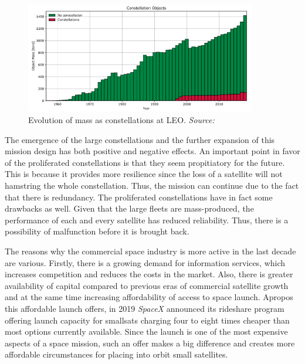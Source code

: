 \begin{figure}
\centering
\includegraphics[width=0.9\textwidth]{Images/constellation_mass_LEO.png}\caption{Evolution of mass as constellations at LEO. \textit{Source: \cite{ESA 2019}}}
\label{constellation_mass_LEO} 
\end{figure}

The emergence of the large constellations and the further expansion of this mission design has both positive and negative effects. An important point in favor of the proliferated constellations is that they seem propitiatory for the future. This is because it provides more resilience since the loss of a satellite will not hamstring the whole constellation. Thus, the mission can continue due to the fact that there is redundancy. The proliferated constellations have in fact some drawbacks as well. Given that the large fleets are mass-produced, the performance of each and every satellite has reduced reliability. Thus, there is a possibility of malfunction before it is brought back. 

The reasons why the commercial space industry is more active in the last decade are various. Firstly, there is a growing demand for information services, which increases competition and reduces the costs in the market. Also, there is greater availability of capital compared to previous eras of commercial satellite growth and at the same time increasing affordability of access to space launch. \cite{Hallex} Apropos this affordable launch offers, in 2019 \textit{SpaceX} announced its rideshare program offering launch capacity for smallsats charging four to eight times cheaper than most options currently available. Since the launch is one of the most expensive aspects of a space mission, such an offer makes a big difference and creates more affordable circumstances for placing into orbit small satellites. \cite{Erwin}

